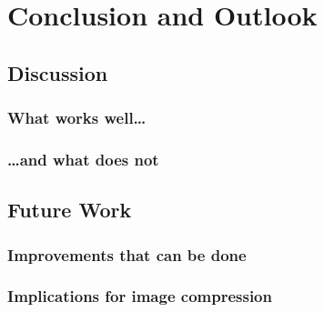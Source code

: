 \chapter{Conclusion and Outlook}

\label{ch:Conclusion}

\section{Discussion}\label{sec:Discussion}
\subsection{What works well\dots}
\subsection{\dots and what does not}
\section{Future Work}
\subsection{Improvements that can be done}
\subsection{Implications for image compression}
